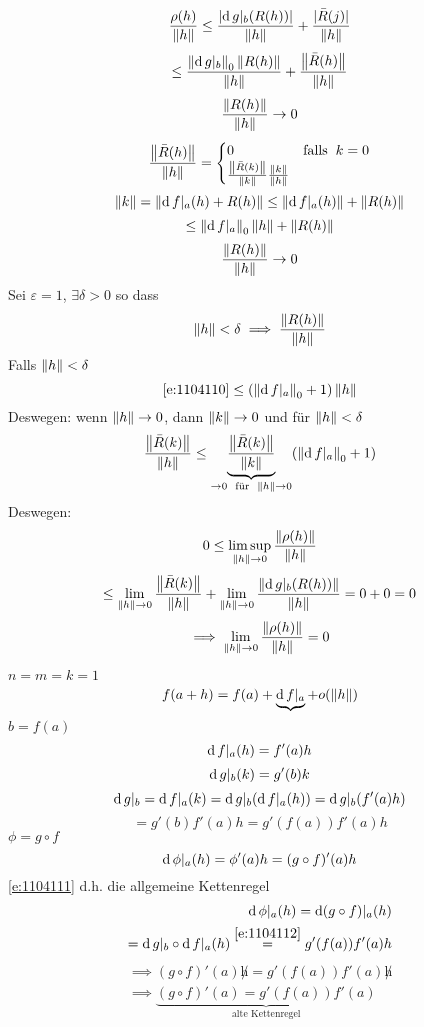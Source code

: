 \begin{Lem}
  \[\frac{\rho(h)}{\left\| h \right\|}\leq\frac{\mathopen| \operatorname{d} g|_b (R(h)) \mathclose|}{\left\| h \right\|}+\frac{\mathopen| \bar R(j) \mathclose|}{\left\| h \right\|}\]
  \[\leq\frac{\left\| \operatorname{d} g|_b \right\|_0\left\| R(h) \right\|}{\left\| h \right\|}+\frac{\left\| \bar R(h) \right\|}{\left\| h \right\|}\]
  \[\frac{\left\| R(h) \right\|}{\left\| h \right\|}\rightarrow 0\]
  \[\frac{\left\| \bar R(h) \right\|}{\left\| h \right\|} = \begin{cases}
    0 & \text{falls}\hspace{2mm} k=0\\
    \frac{\left\| \bar R(k) \right\|}{\left\| k \right\|}\frac{\left\| k \right\|}{\left\| h \right\|}
  \end{cases}\]
  \[\left\| k \right\|=\left\| \operatorname{d} f|_a(h)+R(h) \right\|\leq \left\| \operatorname{d} f|_a(h) \right\|+\left\| R(h) \right\|\]
  \begin{equation}
    \label{e:1104110}
    \leq \left\| \operatorname{d} f|_a \right\|_0\left\| h \right\|+\left\| R(h) \right\|
  \end{equation}
  \[\frac{\left\| R(h) \right\|}{\left\| h \right\|}\rightarrow 0\]
  Sei $\varepsilon=1$, $\exists \delta>0$ so dass
  \[\left\| h \right\|<\delta\implies \frac{\left\| R(h) \right\|}{\left\| h \right\|}\]
  Falls $\left\| h \right\|<\delta$
  \[\ref{e:1104110}\leq (\left\| \operatorname{d} f|_a \right\|_0+1)\left\| h \right\|\]
  Deswegen: wenn $\left\| h \right\|\rightarrow 0$, dann $\left\| k \right\|\rightarrow 0$ und für $\left\| h \right\|<\delta$
  \[\frac{\left\| \bar R(k) \right\|}{\left\| h \right\|}\leq \underbrace{\frac{\left\| \bar R(k) \right\|}{\left\| k \right\|}}_{\rightarrow 0\hspace{2mm}\text{für}\hspace{2mm}\left\| h \right\|\rightarrow 0}(\left\| \operatorname{d} f|_a \right\|_0+1)\]
  Deswegen:
  \[0\leq \limsup_{\left\| h \right\|\rightarrow 0}\frac{\left\| \rho(h) \right\|}{\left\| h \right\|}\]
  \[\leq\displaystyle\lim_{\left\| h \right\|\rightarrow0}\frac{\left\| \bar R(k) \right\|}{\left\| h \right\|}+\displaystyle\lim_{\left\| h \right\|\rightarrow0}\frac{\left\| \operatorname{d} g|_b(R(h)) \right\|}{\left\| h \right\|}=0+0=0\]
  \[\implies \displaystyle\lim_{\left\| h \right\|\rightarrow0}\frac{\left\| \rho(h) \right\|}{\left\| h \right\|}=0\]
\end{Lem}
\begin{Bem}
  $n=m=k=1$
  \[f(a+h)=f(a)+\underbrace{\operatorname{d} f|_a}+o(\left\| h \right\|)\]
  $b=f(a)$
  \[\operatorname{d} f|_a(h)=f'(a)h\]
  \[\operatorname{d} g|_b(k)=g'(b)k\]
  \[\operatorname{d} g|_b=\operatorname{d} f|_a(k)=\operatorname{d} g|_b(\operatorname{d} f|_a(h))=\operatorname{d} g|_b(f'(a)h)\]
  \begin{equation}
    \label{e:1104112}
    =g'(b)f'(a)h=g'(f(a))f'(a)h
  \end{equation}
  $\phi=g\circ f$
  \[\operatorname{d} \phi|_a(h)=\phi'(a)h=(g\circ f)'(a)h\]
  \ref{e:1104111} d.h. die allgemeine Kettenregel
  \begin{eqnarray*}
    \operatorname{d} \phi|_a(h)=\operatorname{d} (g\circ f)|_a(h)\\
    =\operatorname{d} g|_b\circ \operatorname{d} f|_a(h)\stackrel{\ref{e:1104112}}{=}g'(f(a))f'(a)h
  \end{eqnarray*}
  \begin{eqnarray*}
    \implies(g\circ f)'(a)\not h=g'(f(a))f'(a)\not h\\
    \implies \underbrace{(g\circ f)'(a)=g'(f(a))f'(a)}_{\text{alte Kettenregel}}
  \end{eqnarray*}
\end{Bem}
